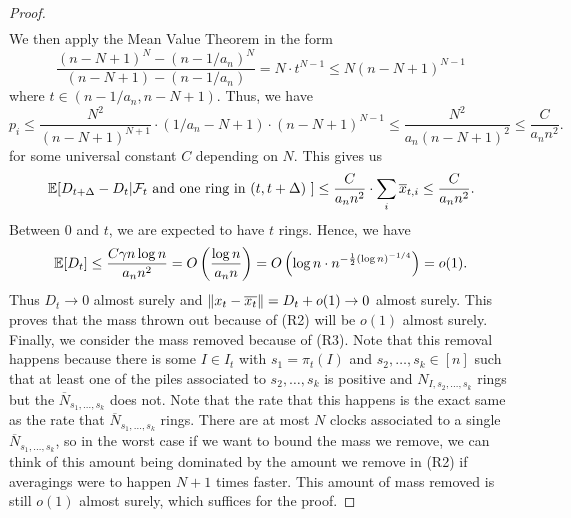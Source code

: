 \documentclass[12pt]{article}
\begin{document}
\begin{proof}
\begin{align*}
	\end{align*}
	We then apply the Mean Value Theorem in the form
	\[
		\frac{(n-N+1)^N - (n-1/a_n)^N}{(n-N+1) - (n-1/a_n)} = N \cdot t^{N-1} \leq N (n-N+1)^{N-1}
	\]
	where $t \in (n-1/a_n, n-N+1)$. Thus, we have
	\[
		p_i \leq \frac{N^2}{(n-N+1)^{N+1}} \cdot (1/a_n - N + 1) \cdot (n-N+1)^{N-1} \leq \frac{N^2}{a_n (n-N+1)^2} \leq \frac{C}{a_n n^2}.
	\]
	for some universal constant $C$ depending on $N$. This gives us 
	\[
		\mathbb{E} [ D_{t + \Delta} - D_t | \mathcal{F}_t \text{ and one ring in $(t, t + \Delta)$ } ] \leq \frac{C}{a_n n^2} \cdot \sum_i \overline{x}_{t, i} \leq \frac{C}{a_n n^2}.
	\]
	Between $0$ and $t$, we are expected to have $t$ rings. Hence, we have 
	\[
		\mathbb{E} [D_t] \leq \frac{C \gamma n \log n}{a_n n^2} = O \left ( \frac{\log n}{a_n n} \right ) = O \left ( \log n \cdot n^{- \frac{1}{2}(\log n)^{-1/4}} \right ) = o(1). 
	\]
	Thus $D_t \to 0$ almost surely and $\left\lVert x_t - \overline{x_t} \right\rVert = D_t + o(1) \to 0$ almost surely. This proves that the mass thrown out because of (R2) will be $o(1)$ almost surely. Finally, we consider the mass removed because of (R3). Note that this removal happens because there is some $I \in I_t$ with $s_1 = \pi_t(I)$ and $s_2, \ldots, s_k \in [n]$ such that at least one of the piles associated to $s_2, \ldots, s_k$ is positive and $N_{I, s_2, \ldots, s_k}$ rings but the $\overline{N}_{s_1, \ldots, s_k}$ does not. Note that the rate that this happens is the exact same as the rate that $\overline{N}_{s_1, \ldots, s_k}$ rings. There are at most $N$ clocks associated to a single $\overline{N}_{s_1, \ldots, s_k}$, so in the worst case if we want to bound the mass we remove, we can think of this amount being dominated by the amount we remove in (R2) if averagings were to happen $N+1$ times faster. This amount of mass removed is still $o(1)$ almost surely, which suffices for the proof. 
\end{proof}
\end{document}
